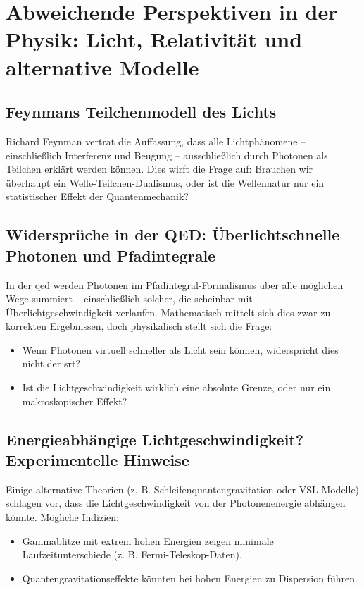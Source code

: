 \section{Abweichende Perspektiven in der Physik: Licht, Relativität und alternative Modelle}
\subsection{Feynmans Teilchenmodell des Lichts}
Richard Feynman vertrat die Auffassung, dass alle Lichtphänomene – einschließlich Interferenz und Beugung – ausschließlich durch Photonen als Teilchen erklärt werden können.
Dies wirft die Frage auf: Brauchen wir überhaupt ein Welle-Teilchen-Dualismus, oder ist die Wellennatur nur ein statistischer Effekt der Quantenmechanik?

\subsection{Widersprüche in der QED: Überlichtschnelle Photonen und Pfadintegrale}
In der \gls{qed} werden Photonen im Pfadintegral-Formalismus über alle möglichen Wege summiert – einschließlich solcher, die scheinbar mit Überlichtgeschwindigkeit verlaufen.
Mathematisch mittelt sich dies zwar zu korrekten Ergebnissen, doch physikalisch stellt sich die Frage:

\begin{itemize}
    \item Wenn Photonen virtuell schneller als Licht sein können, widerspricht dies nicht der \gls{srt}?
    \item Ist die Lichtgeschwindigkeit wirklich eine absolute Grenze, oder nur ein makroskopischer Effekt?
\end{itemize}

\subsection{Energieabhängige Lichtgeschwindigkeit? Experimentelle Hinweise}
Einige alternative Theorien (z. B. Schleifenquantengravitation oder VSL-Modelle) schlagen vor, dass die Lichtgeschwindigkeit von der Photonenenergie abhängen könnte.
Mögliche Indizien:

\begin{itemize}
    \item Gammablitze mit extrem hohen Energien zeigen minimale Laufzeitunterschiede (z. B. Fermi-Teleskop-Daten).
    \item Quantengravitationseffekte könnten bei hohen Energien zu Dispersion führen.
\end{itemize}


